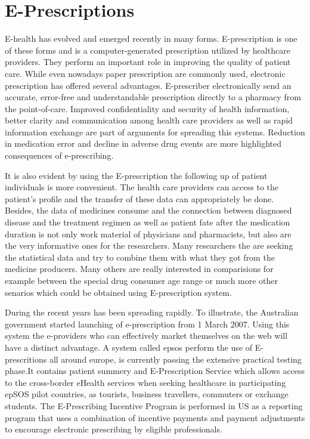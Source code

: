 \documentclass[10pt, conference, compsocconf]{IEEEtran}
\begin{document}
\section{E-Prescriptions}
E-health has evolved and emerged recently in many forms. 
E-prescription is one of these forms and is a computer-generated prescription utilized by healthcare providers.
They perform an important role in improving the quality of patient care.
While even nowadays paper prescription are commonly used, electronic prescription has offered several advantages.
E-prescriber electronically send an accurate, error-free and understandable prescription directly to a pharmacy from the point-of-care.
Improved confidentiality and security of health information, better clarity and communication among health care providers as well as rapid information exchange are part of arguments for spreading this systems.
Reduction in medication error and decline in adverse drug events are more highlighted consequences of e-prescribing.

It is also evident by using the E-prescription the following up of patient individuals is more convenient.
The health care providers can access to the patient's profile and the transfer of these data can appropriately be done.
Besides, the data of medicines consume and the connection between diagnosed disease and the treatment regimen as well as patient fate after the medication duration is not only work material of  physicians and pharmacists, but also are the very informative ones for the researchers.
Many researchers  the are seeking the statistical data and try to combine them with what they got from the medicine producers. Many others are really interested in comparisions for example between the special drug consumer age range or much more other senarios which could be obtained using E-prescription system.

During the recent years has been spreading rapidly. To illustrate, the Australian government started launching of e-prescription from 1 March 2007.
Using this system the e-providers who can effectively market themselves on the web will have a distinct advantage\cite{Ravichandran}.
A system called epsos perform the use of E-prescritions all around europe, is currently passing the extensive practical testing phase.It contains patient summery and E-Prescription Service which allows access to the cross-border eHealth services when seeking healthcare in participating epSOS pilot countries, as tourists, business travellers, commuters or exchange students.
The E-Prescribing Incentive Program is performed in US as a reporting program that uses a combination of incentive payments and payment adjustments to encourage electronic prescribing by eligible professionals.
\end{document}
